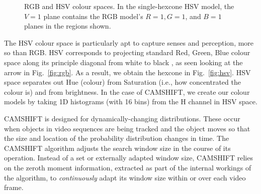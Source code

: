 \begin{figure}
\centering
{} \quad

\caption[RGB and HSV colour spaces]{RGB and HSV colour spaces. In the single-hexcone HSV model, the $V = 1$ plane contains the RGB model's $R = 1, G = 1$, and $B = 1$ planes in the regions shown.}
\label{fig:rgb-hsv}
\end{figure}

The \ac{HSV} colour space is particularly apt to capture senses and perception, more so than \ac{RGB}. \ac{HSV} corresponds to projecting standard Red, Green, Blue colour space along its principle diagonal from white to black \cite{smith:1978}, as seen looking at the arrow in Fig.~\ref{fig:rgb}. As a result, we obtain the hexcone in Fig.~\ref{fig:hsv}. 
\ac{HSV} space separates out Hue (colour) from Saturation (i.e., how concentrated the colour is) and from brightness. In the case of \ac{CAMSHIFT}, we create our colour models by taking 1D histograms (with 16 bins) from the H channel in \ac{HSV} space.



\ac{CAMSHIFT} is designed for dynamically-changing distributions. These occur when objects in video sequences are being tracked and the object moves so that the size and location of the probability distribution changes in time. The \ac{CAMSHIFT} algorithm adjusts the search window size in the course of its operation. Instead of a set or externally adapted window size, \ac{CAMSHIFT} relies on the zeroth moment information, extracted as part of the internal workings of the algorithm, to \emph{continuously} adapt its window size within or over each video frame.

